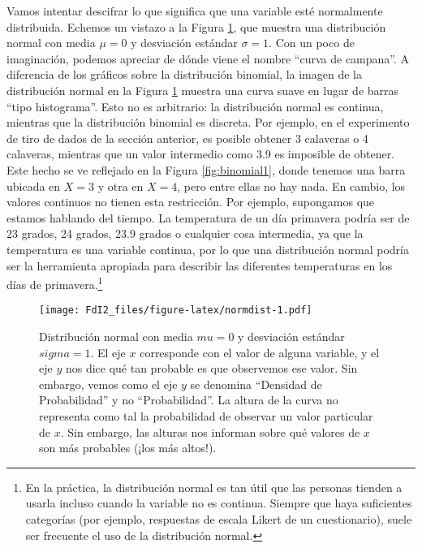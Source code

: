 \documentclass[spanish,]{book}
\let\rmarkdownfootnote\footnote%
\def\footnote{\protect\rmarkdownfootnote}
\begin{document}
Vamos intentar descifrar lo que significa que una variable esté
normalmente distribuida. Echemos un vistazo a la Figura
\ref{fig:normdist}, que muestra una distribución normal con media
\(\mu = 0\) y desviación estándar \(\sigma = 1\). Con un poco de
imaginación, podemos apreciar de dónde viene el nombre ``curva de
campana''. A diferencia de los gráficos sobre la distribución binomial,
la imagen de la distribución normal en la Figura \ref{fig:normdist}
muestra una curva suave en lugar de barras ``tipo histograma''. Esto no
es arbitrario: la distribución normal es continua, mientras que la
distribución binomial es discreta. Por ejemplo, en el experimento de
tiro de dados de la sección anterior, es posible obtener 3 calaveras o 4
calaveras, mientras que un valor intermedio como 3.9 es imposible de
obtener. Este hecho se ve reflejado en la Figura \ref{fig:binomial1},
donde tenemos una barra ubicada en \(X=3\) y otra en \(X=4\), pero entre
ellas no hay nada. En cambio, los valores continuos no tienen esta
restricción. Por ejemplo, supongamos que estamos hablando del tiempo. La
temperatura de un día primavera podría ser de 23 grados, 24 grados, 23.9
grados o cualquier cosa intermedia, ya que la temperatura es una
variable continua, por lo que una distribución normal podría ser la
herramienta apropiada para describir las diferentes temperaturas en los
días de primavera.\footnote{En la práctica, la distribución normal es
  tan útil que las personas tienden a usarla incluso cuando la variable
  no es continua. Siempre que haya suficientes categorías (por ejemplo,
  respuestas de escala Likert de un cuestionario), suele ser frecuente
  el uso de la distribución normal.}

\begin{figure}
\centering
\texttt{[image: FdI2\_files/figure-latex/normdist-1.pdf]}
\caption{\label{fig:normdist} Distribución normal con media \(mu = 0\) y
desviación estándar \(sigma = 1\). El eje \(x\) corresponde con el valor
de alguna variable, y el eje \(y\) nos dice qué tan probable es que
observemos ese valor. Sin embargo, vemos como el eje \(y\) se denomina
``Densidad de Probabilidad'' y no ``Probabilidad''. La altura de la
curva no representa como tal la probabilidad de observar un valor
particular de \(x\). Sin embargo, las alturas nos informan sobre qué
valores de \(x\) son más probables (¡los más altos!).}
\end{figure}
\end{document}
